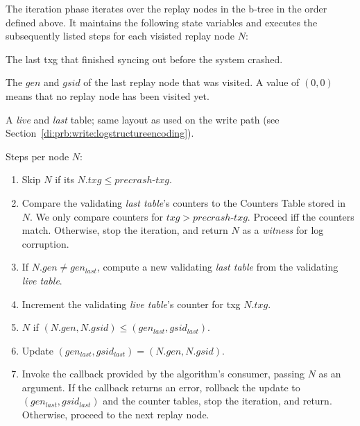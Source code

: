 \documentclass[12pt,a4paper,twoside]{book}
\begin{document}
\begin{samepage}
The iteration phase iterates over the replay nodes in the b-tree in the order defined above.
It maintains the following state variables and executes the subsequently listed steps for each visisted replay node $N$:
 \begin{description}[noitemsep,leftmargin=1.5cm,labelindent=1cm]
    \item[precrash-txg] The last txg that finished syncing out before the system crashed.
    \item[$\mathbf{(gen_{last}, gsid_{last})}$] The $gen$ and $gsid$ of the last replay node that was visited.
        A value of $(0,0)$ means that no replay node has been visited yet.
    \item[validating counter tables] A \textit{live} and \textit{last} table; same layout as used on the write path (see Section~\ref{di:prb:write:logstructureencoding}).
\end{description}
Steps per node $N$:
\begin{enumerate}[noitemsep]
    \item \label{replayStep:skiptxg} Skip $N$ if its $N.txg \le precrash\text{-}txg$.
    \item \label{replayStep:validate} Compare the validating \textit{last table}'s counters to the Counters Table stored in $N$.
        We only compare counters for $txg > precrash\text{-}txg$.
        Proceed iff the counters match. Otherwise, stop the iteration, and return $N$ as a \textit{witness} for log corruption.
    \item \label{replayStep:bump1} If $N.gen \neq gen_{last}$, compute a new validating \textit{last table} from the validating \textit{live table}.
    \item \label{replayStep:bump2} Increment the validating \textit{live table}'s counter for txg $N.txg$.
    \item \label{replayStep:skipreplayed} $N$ if $(N.gen,N.gsid) \le (gen_{last}, gsid_{last})$.
    \item \label{replayStep:bump3} Update $(gen_{last}, gsid_{last}) = (N.gen, N.gsid)$.
    \item \label{replayStep:invoke} Invoke the callback provided by the algorithm's consumer, passing $N$ as an argument.
        If the callback returns an error, rollback the update to $(gen_{last}, gsid_{last})$ and the counter tables, stop the iteration, and return.
        Otherwise, proceed to the next replay node.
\end{enumerate}
\end{samepage}
\end{document}
